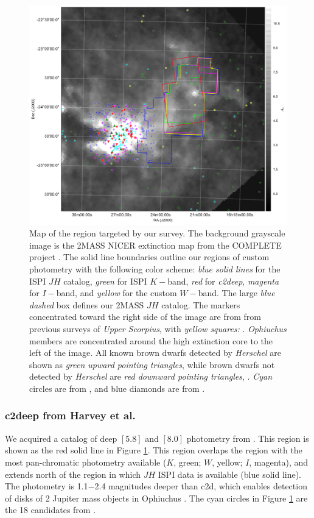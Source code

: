 \begin{figure}[ht!]
\caption{ Map of the region targeted by our survey.  The background grayscale image is the 2MASS NICER extinction map \citep{2008A&A...489..143L} from the COMPLETE project \citep{2006AJ....131.2921R}.  The solid line boundaries outline our regions of custom photometry with the following color scheme: \emph{blue solid lines} for the ISPI $JH$ catalog, \emph{green} for ISPI $K-$band, \emph{red} for \emph{c2deep}, \emph{magenta} for $I-$band, and \emph{yellow} for the custom $W-$band.  The large \emph{blue dashed} box defines our 2MASS $JH$ catalog.  The markers concentrated toward the right side of the image are from from previous surveys of \emph{Upper Scorpius}, with \emph{yellow squares:} \cite{2006AJ....131.3016S}.  \emph{Ophiuchus} members are concentrated around the high extinction core to the left of the image.  All known brown dwarfs detected by \emph{Herschel} are shown as \emph{green upward pointing triangles}, while brown dwarfs not detected by \emph{Herschel} are \emph{red downward pointing triangles}, \cite{2013A&A...559A.126A}. \emph{Cyan} circles are from \citet{2010ApJ...720.1374H}, and blue diamonds are from \citet{allers06}.\label{fig_star_chart}}
\centering
\includegraphics[scale=0.5]{chIMACS/figures/Ophiuchus_map}
\end{figure}


\subsubsection{c2deep from Harvey et al.}
We acquired a catalog of deep $[5.8]$ and $[8.0]$ photometry from \citet{2010ApJ...720.1374H}.  This region is shown as the red solid line in Figure \ref{fig_star_chart}.  This region overlaps the region with the most pan-chromatic photometry available ($K$, green; $W$, yellow; $I$, magenta), and extends north of the region in which $JH$ ISPI data is available (blue solid line).  The \citet{2010ApJ...720.1374H} photometry is 1.1$-$2.4 magnitudes deeper than c2d, which enables detection of disks of 2 Jupiter mass objects in Ophiuchus \citep{allers06}.  The cyan circles in Figure \ref{fig_star_chart} are the 18 candidates from \citet{2010ApJ...720.1374H}.  

